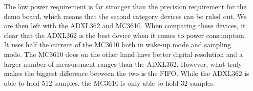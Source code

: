 The low power requirement is far stronger than the precision requirement for the demo board, which means that the second category devices can be ruled out. We are then left with the ADXL362 and MC3610. When comparing these devices, it clear that the ADXL362 is the best device when it comes to power consumption. It uses half the current of the MC3610 both in wake-up mode and sampling mode. The MC3610 does on the other hand have better digital resolution and a larger number of measurement ranges than the ADXL362. However, what truly makes the biggest difference between the two is the FIFO. While the ADXL362 is able to hold 512 samples, the MC3610 is only able to hold 32 samples. 